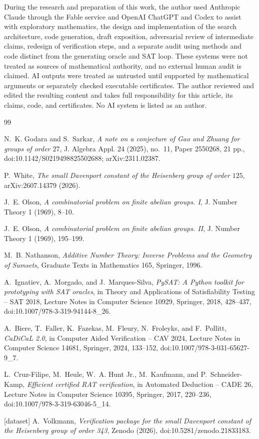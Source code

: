 \documentclass[11pt]{amsart}
\theoremstyle{definition}
\begin{document}
During the research and preparation of this work, the author used
Anthropic Claude through the Fable service and OpenAI ChatGPT and Codex
to assist with exploratory mathematics, the design and implementation
of the search architecture, code generation, draft exposition,
adversarial review of intermediate claims, redesign of verification
steps, and a separate audit using methods and code distinct from the
generating oracle and SAT loop.  These systems were not treated as
sources of mathematical authority, and no external human audit is
claimed.  AI outputs were treated as untrusted until supported by
mathematical arguments or separately checked executable certificates.
The author reviewed and edited the resulting content and takes full
responsibility for this article, its claims, code, and certificates.
No AI system is listed as an author.

\enlargethispage{3\baselineskip}
\begin{thebibliography}{99}

N.~K. Godara and S.~Sarkar,
\emph{A note on a conjecture of Gao and Zhuang for groups of order $27$},
J. Algebra Appl. 24 (2025), no.~11, Paper 2550268, 21 pp.,
doi:10.1142/S0219498825502688; arXiv:2311.02387.

P.~White,
\emph{The small Davenport constant of the Heisenberg group of order $125$},
arXiv:2607.14379 (2026).

J.~E. Olson,
\emph{A combinatorial problem on finite abelian groups. I},
J. Number Theory 1 (1969), 8--10.

J.~E. Olson,
\emph{A combinatorial problem on finite abelian groups. II},
J. Number Theory 1 (1969), 195--199.

M.~B. Nathanson,
\emph{Additive Number Theory: Inverse Problems and the Geometry of Sumsets},
Graduate Texts in Mathematics 165, Springer, 1996.

A.~Ignatiev, A.~Morgado, and J.~Marques-Silva,
\emph{PySAT: A Python toolkit for prototyping with SAT oracles},
in Theory and Applications of Satisfiability Testing -- SAT 2018,
Lecture Notes in Computer Science 10929, Springer, 2018, 428--437,
doi:10.1007/978-3-319-94144-8\_26.

A.~Biere, T.~Faller, K.~Fazekas, M.~Fleury, N.~Froleyks, and F.~Pollitt,
\emph{CaDiCaL 2.0},
in Computer Aided Verification -- CAV 2024,
Lecture Notes in Computer Science 14681, Springer, 2024, 133--152,
doi:10.1007/978-3-031-65627-9\_7.

L.~Cruz-Filipe, M.~Heule, W.~A. Hunt Jr., M.~Kaufmann, and P.~Schneider-Kamp,
\emph{Efficient certified RAT verification},
in Automated Deduction -- CADE 26,
Lecture Notes in Computer Science 10395, Springer, 2017, 220--236,
doi:10.1007/978-3-319-63046-5\_14.

\textup{[dataset]} A.~Volkmann,
\emph{Verification package for the small Davenport constant of the Heisenberg group of order 343},
Zenodo (2026), doi:10.5281/zenodo.21833183.

\end{thebibliography}
\end{document}
